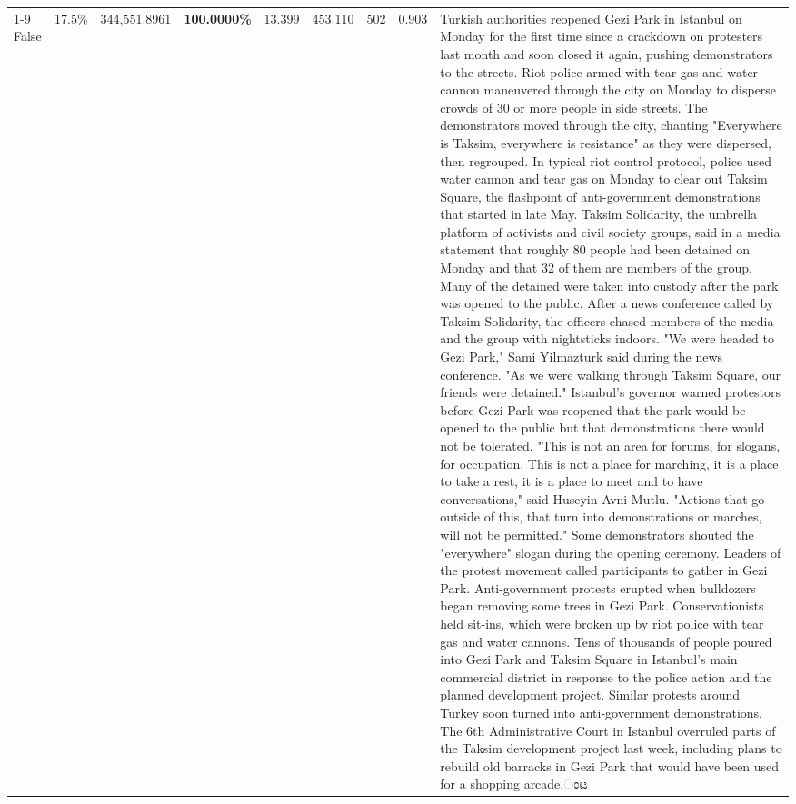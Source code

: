 \begin{table}[H]
\begin{tabular}{lllrlllll}
\cline{1-9}
False & 17.5\% & 344,551.8961 & \bfseries \color{red} 100.0000\% & 13.399 & 453.110 & 502 & 0.903 & Turkish authorities reopened Gezi Park in Istanbul on Monday for the first time since a crackdown on protesters last month and soon closed it again, pushing demonstrators to the streets. Riot police armed with tear gas and water cannon maneuvered through the city on Monday to disperse crowds of 30 or more people in side streets. The demonstrators moved through the city, chanting "Everywhere is Taksim, everywhere is resistance" as they were dispersed, then regrouped. In typical riot control protocol, police used water cannon and tear gas on Monday to clear out Taksim Square, the flashpoint of anti-government demonstrations that started in late May. Taksim Solidarity, the umbrella platform of activists and civil society groups, said in a media statement that roughly 80 people had been detained on Monday and that 32 of them are members of the group. Many of the detained were taken into custody after the park was opened to the public. After a news conference called by Taksim Solidarity, the officers chased members of the media and the group with nightsticks indoors. "We were headed to Gezi Park," Sami Yilmazturk said during the news conference. "As we were walking through Taksim Square, our friends were detained." Istanbul's governor warned protestors before Gezi Park was reopened that the park would be opened to the public but that demonstrations there would not be tolerated. "This is not an area for forums, for slogans, for occupation. This is not a place for marching, it is a place to take a rest, it is a place to meet and to have conversations," said Huseyin Avni Mutlu. "Actions that go outside of this, that turn into demonstrations or marches, will not be permitted." Some demonstrators shouted the "everywhere" slogan during the opening ceremony. Leaders of the protest movement called participants to gather in Gezi Park. Anti-government protests erupted when bulldozers began removing some trees in Gezi Park. Conservationists held sit-ins, which were broken up by riot police with tear gas and water cannons. Tens of thousands of people poured into Gezi Park and Taksim Square in Istanbul's main commercial district in response to the police action and the planned development project. Similar protests around Turkey soon turned into anti-government demonstrations. The 6th Administrative Court in Istanbul overruled parts of the Taksim development project last week, including plans to rebuild old barracks in Gezi Park that would have been used for a shopping arcade.ಂಟ \\

\end{tabular}
\end{table}

